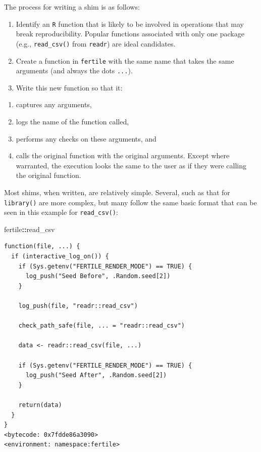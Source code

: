 \documentclass[12pt,twoside]{reedthesis}
\newenvironment{Shaded}{\begin{snugshade}}{\end{snugshade}}
\newcommand{\NormalTok}[1]{#1}
\newcommand{\OperatorTok}[1]{\textcolor[rgb]{0.81,0.36,0.00}{\textbf{#1}}}
\providecommand{\tightlist}{%
  \setlength{\itemsep}{0pt}\setlength{\parskip}{0pt}}
\begin{document}
The process for writing a shim is as follows:
\begin{enumerate}
\def\labelenumi{\arabic{enumi}.}
\item
  Identify an \texttt{R} function that is likely to be involved in operations that may break reproducibility. Popular functions associated with only one package (e.g., \texttt{read\_csv()} from \texttt{readr}) are ideal candidates.
\item
  Create a function in \texttt{fertile} with the same name that takes the same arguments (and always the dots \texttt{...}).
\item
  Write this new function so that it:
\end{enumerate}
\begin{enumerate}
\def\labelenumi{\alph{enumi})}
\tightlist
\item
  captures any arguments,
\item
  logs the name of the function called,
\item
  performs any checks on these arguments, and
\item
  calls the original function with the original arguments. Except where warranted, the execution looks the same to the user as if they were calling the original function.
\end{enumerate}
Most shims, when written, are relatively simple. Several, such as that for \texttt{library()} are more complex, but many follow the same basic format that can be seen in this example for \texttt{read\_csv()}:
\begin{Shaded}
\begin{Highlighting}[]
\NormalTok{fertile}\OperatorTok{::}\NormalTok{read_csv}
\end{Highlighting}
\end{Shaded}
\begin{verbatim}
function(file, ...) {
  if (interactive_log_on()) {
    if (Sys.getenv("FERTILE_RENDER_MODE") == TRUE) {
      log_push("Seed Before", .Random.seed[2])
    }

    log_push(file, "readr::read_csv")

    check_path_safe(file, ... = "readr::read_csv")

    data <- readr::read_csv(file, ...)

    if (Sys.getenv("FERTILE_RENDER_MODE") == TRUE) {
      log_push("Seed After", .Random.seed[2])
    }

    return(data)
  }
}
<bytecode: 0x7fdde86a3090>
<environment: namespace:fertile>
\end{verbatim}
\end{document}
